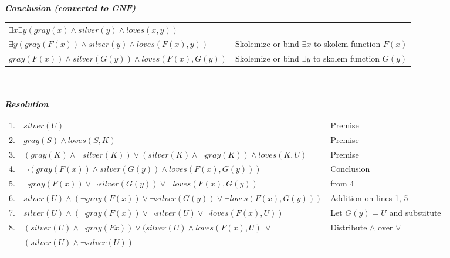 \documentclass{article}
\begin{document}
\begin{enumerate}
\begin{tabular}{lll}
    \end{tabular}\\\\
    \textit{\textbf{Conclusion (converted to CNF)}}\\
    \begin{tabular}{ll}
        $\exists x \exists y (gray(x) \wedge silver(y) \wedge loves(x,y))$\\
        $\exists y (gray(F(x)) \wedge silver(y) \wedge loves(F(x),y))$ & Skolemize or bind $\exists x$ to skolem function $F(x)$\\
        $gray(F(x)) \wedge silver(G(y)) \wedge loves(F(x),G(y))$ & Skolemize or bind $\exists y$ to skolem function $G(y)$\\
    \end{tabular}\\\\
    \textit{\textbf{Resolution}}\\
    \begin{tabular}{lll}
        1. &  $silver(U)$ & Premise\\
        2. & $gray(S) \wedge loves(S, K)$ & Premise\\
        3. & $(gray(K) \wedge \neg silver(K)) \vee (silver(K) \wedge \neg gray(K)) \wedge loves(K, U)$ & Premise\\
        4. & $\neg (gray(F(x)) \wedge silver(G(y)) \wedge loves(F(x),G(y)))$ & Conclusion\\
        5. & $\neg gray(F(x)) \vee \neg silver(G(y)) \vee \neg loves(F(x), G(y))$ & from 4\\
        6. & $silver(U) \wedge (\neg gray(F(x)) \vee \neg silver(G(y)) \vee \neg loves(F(x), G(y)))$& Addition on lines 1, 5\\
        7. & $silver(U) \wedge (\neg gray(F(x)) \vee \neg silver(U) \vee \neg loves(F(x), U))$ & Let $G(y) = U$ and substitute \\
        8. & $(silver(U) \wedge \neg gray(Fx)) \vee (silver(U) \wedge loves(F(x), U)\ \vee$& Distribute $\wedge$ over $\vee$\\
           & $ (silver(U) \wedge \neg silver(U))$\\\\


\end{tabular}
\end{enumerate}
\end{document}
